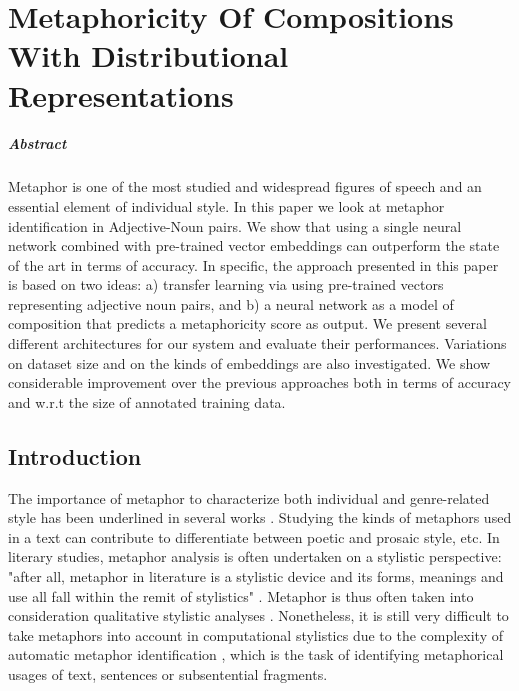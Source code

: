 
\chapter{Metaphoricity Of Compositions With Distributional Representations}


\paragraph{Abstract}
Metaphor is one of the most studied and widespread figures of speech and an essential element of individual style. In this paper we look at metaphor identification in Adjective-Noun pairs. We show that using a single neural network combined with pre-trained vector embeddings can outperform the state of the art in terms of accuracy. In specific, the approach presented in this paper is based on two ideas: a) transfer learning via using pre-trained vectors representing adjective noun pairs, and b) a neural network as a model of composition that predicts a metaphoricity score as output. We present several different architectures for our system and evaluate their performances. Variations on dataset size and on the kinds of embeddings are also investigated.  We show considerable improvement over the previous approaches both in terms of accuracy and w.r.t the size of annotated training data.


\section{Introduction}



The importance of metaphor to characterize both individual and genre-related style has been underlined in several works \citep{leech2007style,simpson2004stylistics,goodman1975status}. Studying the kinds of metaphors used in a text can contribute to differentiate between poetic and prosaic style, etc. In literary studies, metaphor analysis is often undertaken on a stylistic perspective: "after all, metaphor in literature is a stylistic device and its forms, meanings and use all fall within the remit of stylistics" \cite{steen2014metaphor}. Metaphor is thus often taken into consideration  qualitative stylistic analyses \citep{fahnestock2009quid}. Nonetheless, it is still very difficult to take metaphors into account in computational stylistics due to the complexity of automatic metaphor identification \citep{neuman2013metaphor,klebanov2015supervised}, which is the task of identifying metaphorical usages of text, sentences or subsentential fragments. 


